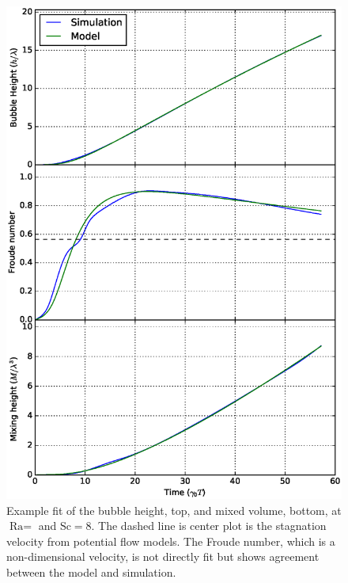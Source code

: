\begin{figure}
\includegraphics[height=\textheight]{figs/H-8-1}
\caption{ 
  Example fit of the bubble height, top, and mixed volume, bottom, at $\text{Ra} = $ and $\text{Sc} = 8$.
  The dashed line is center plot is the stagnation velocity from potential flow models.
  The Froude number, which is a non-dimensional velocity, is not directly fit but shows agreement between the model and simulation.
}
\end{figure}

